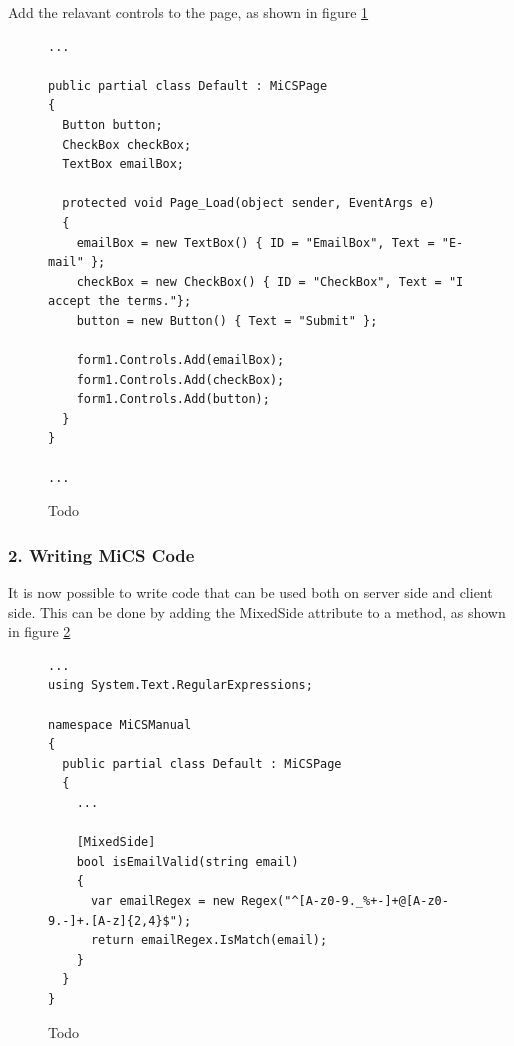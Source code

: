 Add the relavant controls to the page, as shown in figure \ref{fig:mics_add_controls}

\begin{figure}[H]
\begin{lstlisting}[language=CSharp,classoffset=1,morekeywords={Default,MiCSPage,Button,CheckBox,TextBox,EventArgs,ClientSide,InputElement,Document,CheckBoxElement,Window,MixedSide,Regex}]
...

public partial class Default : MiCSPage
{
  Button button;
  CheckBox checkBox;
  TextBox emailBox;

  protected void Page_Load(object sender, EventArgs e)
  {
    emailBox = new TextBox() { ID = "EmailBox", Text = "E-mail" };
    checkBox = new CheckBox() { ID = "CheckBox", Text = "I accept the terms."};
    button = new Button() { Text = "Submit" };

    form1.Controls.Add(emailBox);
    form1.Controls.Add(checkBox);
    form1.Controls.Add(button);
  }
}

...
\end{lstlisting}
\caption{Todo}
\label{fig:mics_add_controls}
\end{figure}



\subsubsection{2. Writing MiCS Code} %
\label{ssub:writing_mics_code}
It is now possible to write code that can be used both on server side and client side. This can be done by adding the MixedSide attribute to a method, as shown in figure \ref{fig:write_mics_code}

\begin{figure}[H]
\begin{lstlisting}[language=CSharp,classoffset=1,morekeywords={Default,MiCSPage,Button,CheckBox,TextBox,EventArgs,ClientSide,InputElement,Document,CheckBoxElement,Window,MixedSide,Regex}]
...
using System.Text.RegularExpressions;

namespace MiCSManual
{    
  public partial class Default : MiCSPage
  {
    ...

    [MixedSide]
    bool isEmailValid(string email)
    {
      var emailRegex = new Regex("^[A-z0-9._%+-]+@[A-z0-9.-]+.[A-z]{2,4}$");
      return emailRegex.IsMatch(email);
    }
  }
}
\end{lstlisting}
\caption{Todo}
\label{fig:write_mics_code}
\end{figure}

